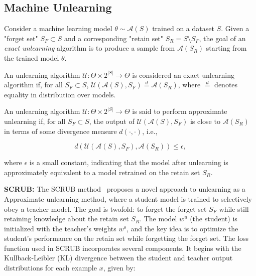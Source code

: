 \documentclass{article} %
\begin{document}
\subsection{Machine Unlearning}
Consider a machine learning model $\theta \sim \mathcal{A}(S)$ trained on a dataset $S$. Given a "forget set" $S_F \subset S$ and a corresponding "retain set" $S_R = S \setminus S_F$, the goal of an \textit{exact unlearning} algorithm is to produce a sample from $\mathcal{A}(S_R)$ starting from the trained model $\theta$.

\begin{definition}
An unlearning algorithm $\mathcal{U}: \Theta \times 2^{|S|} \to \Theta$ is considered an exact unlearning algorithm if, for all $S_F \subset S$, $\mathcal{U}(\mathcal{A}(S), S_F) \overset{d}{=} \mathcal{A}(S_R)$, where $\overset{d}{=}$ denotes equality in distribution over models.
\end{definition}
\begin{definition}
An unlearning algorithm $\mathcal{U}: \Theta \times 2^{|S|} \to \Theta$ is said to perform approximate unlearning if, for all $S_F \subset S$, the output of $\mathcal{U}(\mathcal{A}(S), S_F)$ is close to $\mathcal{A}(S_R)$ in terms of some divergence measure $d(\cdot, \cdot)$, i.e.,

\[
d(\mathcal{U}(\mathcal{A}(S), S_F), \mathcal{A}(S_R)) \leq \epsilon,
\]

where $\epsilon$ is a small constant, indicating that the model after unlearning is approximately equivalent to a model retrained on the retain set $S_R$.
\end{definition}
\textbf{SCRUB:} The SCRUB method~\citep{kurmanji2023unboundedmachineunlearning} proposes a novel approach to unlearning as a Approximate unlearning method, where a student model is trained to selectively obey a teacher model. The goal is twofold: to forget the forget set $S_F$ while still retaining knowledge about the retain set $S_R$. The model $w^u$ (the student) is initialized with the teacher’s weights $w^o$, and the key idea is to optimize the student’s performance on the retain set while forgetting the forget set. The loss function used in SCRUB incorporates several components. It begins with the Kullback-Leibler (KL) divergence between the student and teacher output distributions for each example $x$, given by:
\end{document}

